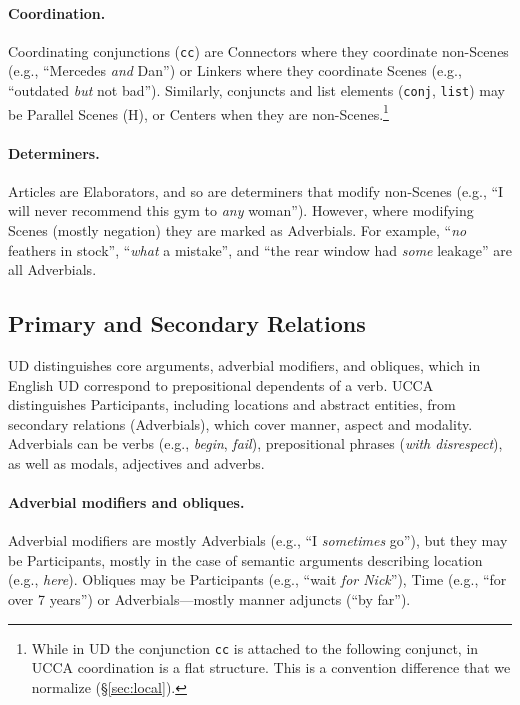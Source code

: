\documentclass[11pt,a4paper]{article}
\begin{document}
\paragraph{Coordination.}
      Coordinating conjunctions (\texttt{cc}) are Connectors where they coordinate non-Scenes
      (e.g., ``Mercedes \textit{and} Dan'')
      or Linkers where they coordinate Scenes (e.g., ``outdated \textit{but} not bad'').
      Similarly, conjuncts and list elements (\texttt{conj}, \texttt{list}) may be Parallel Scenes (H),
      or Centers when they are non-Scenes.\footnote{While in UD 
      the conjunction \texttt{cc} is attached to the following conjunct,
      in UCCA coordination is a flat structure.
      This is a convention difference that we normalize (\S\ref{sec:local}).}

\paragraph{Determiners.}
      Articles are Elaborators, and so are determiners that modify non-Scenes 
      (e.g., ``I will never recommend this gym to \textit{any} woman'').
      However, where modifying Scenes (mostly negation)
      they are marked as Adverbials. For example, ``\textit{no} feathers in stock'', ``\textit{what} a mistake'',
      and ``the rear window had \textit{some} leakage'' are all Adverbials.



\subsection{Primary and Secondary Relations}\label{sec:arguments}

UD distinguishes core arguments, adverbial modifiers,
and obliques, which in English UD correspond to prepositional dependents of a verb.
UCCA distinguishes Participants, including locations and abstract entities,
from secondary relations (Adverbials), 
which cover manner, aspect and modality.
Adverbials can be verbs (e.g., \textit{begin}, \textit{fail}),
prepositional phrases (\textit{with disrespect}),
as well as modals, adjectives and adverbs.

\paragraph{Adverbial modifiers and obliques.}
    Adverbial modifiers are mostly Adverbials (e.g., ``I \textit{sometimes} go''),
    but they may be Participants, mostly in the case of semantic arguments describing location (e.g., \textit{here}).
    Obliques
    may be
    Participants (e.g., ``wait \textit{for Nick}''), Time (e.g., ``for over 7 years'') 
    or Adverbials---mostly manner adjuncts (``by far'').
\end{document}
